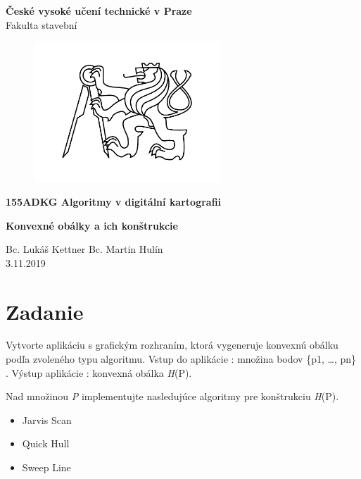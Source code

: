 \documentclass[12pt]{article}
\begin{document}
\begin{titlepage}
\centering
\Large \textbf{České vysoké učení technické v Praze }\\ Fakulta stavební
\vspace{2cm}

\begin{figure}[h!] %
\centering
\includegraphics[width=7cm]{./img/cvut.png}
\end{figure}
 
\Large \textbf{155ADKG Algoritmy v digitální kartografii}
\vspace{1cm}

\LARGE  \textbf{ Konvexné obálky a ich konštrukcie}
\vspace{3cm}

\Large Bc. Lukáš Kettner Bc. Martin Hulín \\ 3.11.2019

 \thispagestyle{empty} %
\end{titlepage}

\tableofcontents    %
\newpage %
\section{Zadanie}
Vytvorte aplikáciu s grafickým rozhraním, ktorá vygeneruje konvexnú obálku podľa zvoleného typu algoritmu. Vstup do aplikácie : množina bodov  \{p1, …, pn\} . Výstup aplikácie : konvexná obálka  \textit{H}(P).

Nad množinou   \textit{P} implementujte nasledujúce algoritmy pre konštrukciu \textit{H}(P).

\begin{itemize}
\item Jarvis Scan
\item Quick Hull
\item Sweep Line
\end{itemize}
		
\end{document}
